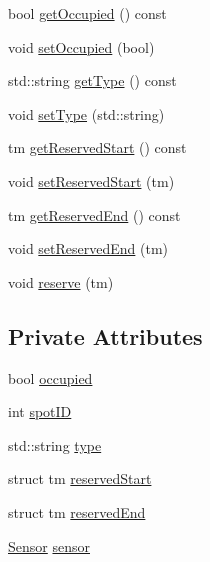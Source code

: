 \begin{DoxyCompactItemize}
bool \mbox{\hyperlink{class_parking_space_afc40502f401e7689685be6248c2ce097}{get\+Occupied}} () const
\item 
void \mbox{\hyperlink{class_parking_space_ab535bca076add6abc31048ea8aff5719}{set\+Occupied}} (bool)
\item 
std\+::string \mbox{\hyperlink{class_parking_space_a93d7ebecb8409d606f74504449518e99}{get\+Type}} () const
\item 
void \mbox{\hyperlink{class_parking_space_a4abd727d17e2045ef0617fb68e8135ed}{set\+Type}} (std\+::string)
\item 
tm \mbox{\hyperlink{class_parking_space_a83b660966c8ed21827b961d4e084c183}{get\+Reserved\+Start}} () const
\item 
void \mbox{\hyperlink{class_parking_space_a6a764047ce175633cc5288cede8eba90}{set\+Reserved\+Start}} (tm)
\item 
tm \mbox{\hyperlink{class_parking_space_a9048ab587b0287dabfa0f8cc202e8bb5}{get\+Reserved\+End}} () const
\item 
void \mbox{\hyperlink{class_parking_space_aac425aba68f7d46d178fb5c33ea0367a}{set\+Reserved\+End}} (tm)
\item 
void \mbox{\hyperlink{class_parking_space_a22e2c189a28f4b56cb73ba807811e6ad}{reserve}} (tm)
\end{DoxyCompactItemize}
\subsection*{Private Attributes}
\begin{DoxyCompactItemize}
\item 
bool \mbox{\hyperlink{class_parking_space_a296bd26740e110c847c9aa423fec4822}{occupied}}
\item 
int \mbox{\hyperlink{class_parking_space_a73726147c4a69b71b004642fa7be3cf5}{spot\+ID}}
\item 
std\+::string \mbox{\hyperlink{class_parking_space_abe337abebed765d6255afc5d6d6a907e}{type}}
\item 
struct tm \mbox{\hyperlink{class_parking_space_ab67b98142322e1285d24aa7dcca3e40e}{reserved\+Start}}
\item 
struct tm \mbox{\hyperlink{class_parking_space_a7bb127221ad5cf6ccfd2ef554efee206}{reserved\+End}}
\item 
\mbox{\hyperlink{class_sensor}{Sensor}} \mbox{\hyperlink{class_parking_space_ae636a6e282227d45c0d32b45be0e4e78}{sensor}}
\end{DoxyCompactItemize}


